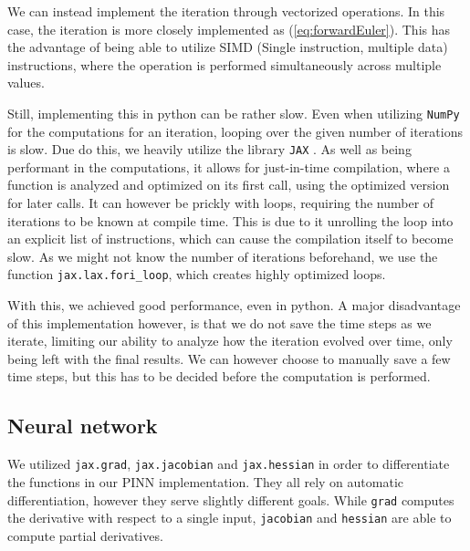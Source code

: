 \documentclass{article}
\theoremstyle{definition}
\begin{document}
We can instead implement the iteration through vectorized operations. In this case, the iteration is more closely implemented as (\ref{eq:forwardEuler}). This has the advantage of being able to utilize SIMD (Single instruction, multiple data) instructions, where the operation is performed simultaneously across multiple values.

Still, implementing this in python can be rather slow. Even when utilizing \verb|NumPy| for the computations for an iteration, looping over the given number of iterations is slow. Due do this, we heavily utilize the library \verb|JAX| \parencite{jax2018github}. As well as being performant in the computations, it allows for just-in-time compilation, where a function is analyzed and optimized on its first call, using the optimized version for later calls. It can however be prickly with loops, requiring the number of iterations to be known at compile time. This is due to it unrolling the loop into an explicit list of instructions, which can cause the compilation itself to become slow. As we might not know the number of iterations beforehand, we use the function \verb|jax.lax.fori_loop|, which creates highly optimized loops.



With this, we achieved good performance, even in python. A major disadvantage of this implementation however, is that we do not save the time steps as we iterate, limiting our ability to analyze how the iteration evolved over time, only being left with the final results. We can however choose to manually save a few time steps, but this has to be decided before the computation is performed.

\subsection{Neural network}
We utilized \verb|jax.grad|, \verb|jax.jacobian| and \verb|jax.hessian| in order to differentiate the functions in our PINN implementation. They all rely on automatic differentiation, however they serve slightly different goals. While \verb|grad| computes the derivative with respect to a single input, \verb|jacobian| and \verb|hessian| are able to compute partial derivatives.
\end{document}
